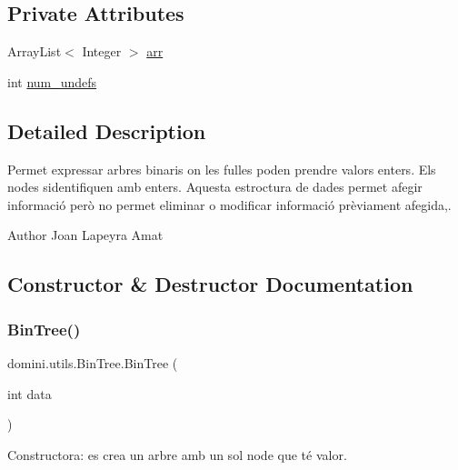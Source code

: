 \subsection*{Private Attributes}
\begin{DoxyCompactItemize}
\item 
Array\+List$<$ Integer $>$ \hyperlink{classdomini_1_1utils_1_1BinTree_a357bcbcf07ba7fcb99d11b237d189e65}{arr}
\item 
int \hyperlink{classdomini_1_1utils_1_1BinTree_a36f1212262c353accbc0a0385fa45a8d}{num\+\_\+undefs}
\end{DoxyCompactItemize}


\subsection{Detailed Description}
Permet expressar arbres binaris on les fulles poden prendre valors enters. Els nodes s\textquotesingle{}identifiquen amb enters. Aquesta estroctura de dades permet afegir informació però no permet eliminar o modificar informació prèviament afegida,. 

\begin{DoxyAuthor}{Author}
Joan Lapeyra Amat 
\end{DoxyAuthor}


\subsection{Constructor \& Destructor Documentation}
\mbox{\label{classdomini_1_1utils_1_1BinTree_a83904c6ebf931ba29a134be5f29a66c7}} 
\subsubsection{\texorpdfstring{Bin\+Tree()}{BinTree()}}
{\footnotesize\ttfamily domini.\+utils.\+Bin\+Tree.\+Bin\+Tree (\begin{DoxyParamCaption}\item[{int}]{data }\end{DoxyParamCaption})\hspace{0.3cm}{\ttfamily [inline]}}



Constructora\+: es crea un arbre amb un sol node que té valor. 



